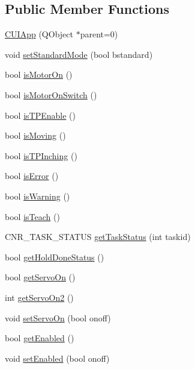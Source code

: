 \subsection*{Public Member Functions}
\begin{DoxyCompactItemize}
\item 
\hyperlink{classCUIApp_afa0b05aa6039932ff99fda50db8e8110}{C\-U\-I\-App} (Q\-Object $\ast$parent=0)
\item 
void \hyperlink{classCUIApp_afd4cae5d66f7323cf38b9f1aed25f900}{set\-Standard\-Mode} (bool bstandard)
\item 
bool \hyperlink{classCUIApp_a0cc9cca9857c0bc9ef25230edc531ccf}{is\-Motor\-On} ()
\item 
bool \hyperlink{classCUIApp_ac8cab0d33456272cfe83542cba03788b}{is\-Motor\-On\-Switch} ()
\item 
bool \hyperlink{classCUIApp_a8e2b967299871e3f1c3a71e30d396f17}{is\-T\-P\-Enable} ()
\item 
bool \hyperlink{classCUIApp_a23dc5321e74f32f21bd32cbf8f483a42}{is\-Moving} ()
\item 
bool \hyperlink{classCUIApp_ac2c793ecc97fd8fdc13873bd425748c1}{is\-T\-P\-Inching} ()
\item 
bool \hyperlink{classCUIApp_a9b5b40e734cd6df6da5e5cb6b8d0f47b}{is\-Error} ()
\item 
bool \hyperlink{classCUIApp_abe557a84d4f46371691d64195f9bfdc1}{is\-Warning} ()
\item 
bool \hyperlink{classCUIApp_afede9804c9ff808fe7fda9cace46317a}{is\-Teach} ()
\item 
C\-N\-R\-\_\-\-T\-A\-S\-K\-\_\-\-S\-T\-A\-T\-U\-S \hyperlink{classCUIApp_a38b78efb82df844035218bf55d242446}{get\-Task\-Status} (int taskid)
\item 
bool \hyperlink{classCUIApp_a1cbbff02bbc244311de643be07f2ab50}{get\-Hold\-Done\-Status} ()
\item 
bool \hyperlink{classCUIApp_af1543e05abe6e4f10612a812f72ac2e4}{get\-Servo\-On} ()
\item 
int \hyperlink{classCUIApp_aa1f8e42c318759f87de95791a272e26d}{get\-Servo\-On2} ()
\item 
void \hyperlink{classCUIApp_a43c0f679870ab278c036ab542cfefe55}{set\-Servo\-On} (bool onoff)
\item 
bool \hyperlink{classCUIApp_a7b6b23d1380f0980aa23e54c588b50ef}{get\-Enabled} ()
\item 
void \hyperlink{classCUIApp_a0bb9aaecc950f991d3ecc69e5895e9e6}{set\-Enabled} (bool onoff)
\item 

\end{DoxyCompactItemize}
